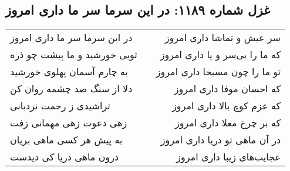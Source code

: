 \begin{center}
\section*{غزل شماره ۱۱۸۹: در این سرما سر ما داری امروز}
\label{sec:1189}
\begin{longtable}{l p{0.5cm} r}
در این سرما سر ما داری امروز
&&
سر عیش و تماشا داری امروز
\\
تویی خورشید و ما پیشت چو ذره
&&
که ما را بی‌سر و پا داری امروز
\\
به چارم آسمان پهلوی خورشید
&&
تو ما را چون مسیحا داری امروز
\\
دلا از سنگ صد چشمه روان کن
&&
که احسان موفا داری امروز
\\
تراشیدی ز رحمت نردبانی
&&
که عزم کوچ بالا داری امروز
\\
زهی دعوت زهی مهمانی زفت
&&
که بر چرخ معلا داری امروز
\\
به پیش هر کسی ماهی بریان
&&
در آن ماهی تو دریا داری امروز
\\
درون ماهی دریا کی دیدست
&&
عجایب‌های زیبا داری امروز
\\
\end{longtable}
\end{center}

